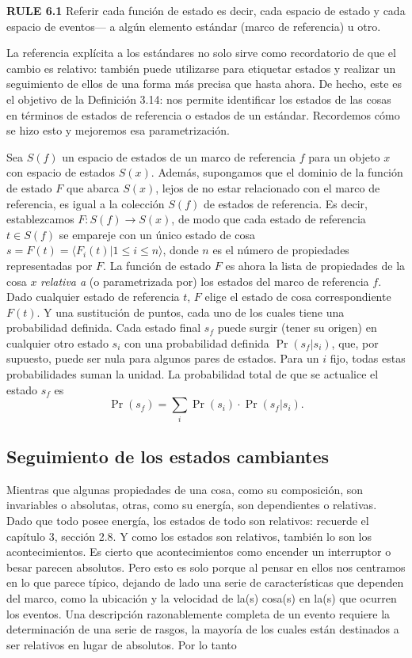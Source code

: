 \begin{justifying}
  \textbf{RULE 6.1} Referir cada función de estado es decir, cada espacio de estado y cada espacio de eventos— a algún elemento estándar (marco de referencia) u otro.

  La referencia explícita a los estándares no solo sirve como recordatorio de que el cambio es relativo: también puede utilizarse para etiquetar estados y realizar un seguimiento de ellos de una forma más precisa que hasta ahora. De hecho, este es el objetivo de la Definición 3.14: nos permite identificar los estados de las cosas en términos de estados de referencia o estados de un estándar. Recordemos cómo se hizo esto y mejoremos esa parametrización.

  Sea $S(f)$ un espacio de estados de un marco de referencia $f$ para un objeto $x$ con espacio de estados $S(x)$. Además, supongamos que el dominio de la función de estado $F$ que abarca $S(x)$, lejos de no estar relacionado con el marco de referencia, es igual a la colección $S(f)$ de estados de referencia. Es decir, establezcamos $F: S(f) \to S(x)$, de modo que cada estado de referencia $t \in S(f)$ se empareje con un único estado de cosa $s=F(t) = \langle F_i(t)| 1 \le i \le n \rangle$, donde $n$ es el número de propiedades representadas por $F$. La función de estado $F$ es ahora la lista de propiedades de la cosa $x$ \textit{relativa a} (o parametrizada por) los estados del marco de referencia $f$. Dado cualquier estado de referencia $t$, $F$ elige el estado de cosa correspondiente $F(t)$. Y una sustitución de
  puntos, cada uno de los cuales tiene una probabilidad definida. Cada estado final
  $s_f$ puede surgir (tener su origen) en cualquier otro estado $s_i$ con una probabilidad definida $\Pr(s_f|s_i)$, que, por supuesto, puede ser nula para algunos pares de estados. Para un $i$ fijo, todas estas probabilidades suman la unidad. La probabilidad total de que se actualice el estado $s_f$ es
  \[
  \Pr(s_f) = \sum_i \Pr(s_i) \cdot \Pr(s_f|s_i).
  \]

  \subsection{Seguimiento de los estados cambiantes}

  Mientras que algunas propiedades de una cosa, como su composición, son invariables o absolutas, otras, como su energía, son
  dependientes o relativas. Dado que todo posee energía, los estados de todo son relativos: recuerde el capítulo 3, sección 2.8. Y como los estados son
  relativos, también lo son los acontecimientos. Es cierto que acontecimientos como encender un interruptor o besar
  parecen absolutos. Pero esto es solo porque al pensar en ellos nos centramos en lo que parece típico, dejando de lado una serie de características que dependen del marco, como la ubicación y la velocidad de la(s) cosa(s) en la(s) que ocurren los eventos. Una descripción razonablemente completa de un evento requiere la determinación de una serie de rasgos, la mayoría de los cuales están destinados a ser relativos en lugar de absolutos. Por lo tanto


\end{justifying}
